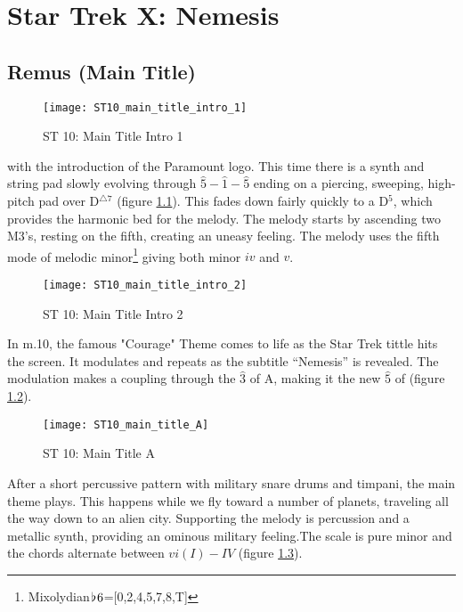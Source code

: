 
\chapter{Star Trek X: Nemesis}

\section{Remus (Main Title)}\label{sec:st 10}
\begin{figure}
\center
\texttt{[image: ST10\_main\_title\_intro\_1]}
	\caption{ST 10: Main Title Intro 1}
	\label{ST10_main_title_intro_1}
\end{figure}

\noindent{} with the introduction of the Paramount logo. This time there is a synth and string pad slowly evolving through \(\hat{5}-\hat{1}-\hat{5}\) ending on a piercing, sweeping, high-pitch pad over D\(^{\triangle 7}\) (figure \ref{ST10_main_title_intro_1}). This fades down fairly quickly to a D\(^{5}\), which provides the harmonic bed for the melody. The melody starts by ascending two M3's, resting on the fifth, creating an uneasy feeling. The melody uses the fifth mode of melodic minor\footnote{Mixolydian\(\hspace*{0.18ex}\flat\hspace*{0.18ex}{6}\)=[0,2,4,5,7,8,T]} giving both minor \(iv\) and \(v\). 

\begin{figure}
\center
\texttt{[image: ST10\_main\_title\_intro\_2]}
	\caption{ST 10: Main Title Intro 2}
	\label{ST10_main_title_intro_2}
\end{figure}
In m.10, the famous "Courage" Theme comes to life as the Star Trek tittle hits the screen. It modulates and repeats as the subtitle ``Nemesis'' is revealed. The modulation makes a coupling through the \(\hat{3}\) of A, making it the new \(\hat{5}\) of \fiss (figure \ref{ST10_main_title_intro_2}).

\begin{figure}
\center
\texttt{[image: ST10\_main\_title\_A]}
	\caption{ST 10: Main Title A}
	\label{ST10_main_title_A}
\end{figure}
After a short percussive pattern with military snare drums and timpani, the main theme plays. This happens while we fly toward a number of planets, traveling all the way down to an alien city. Supporting the melody is percussion and a metallic synth, providing an ominous military feeling.The scale is pure minor and the chords alternate between \(vi(I)-IV\) (figure \ref{ST10_main_title_A}).

